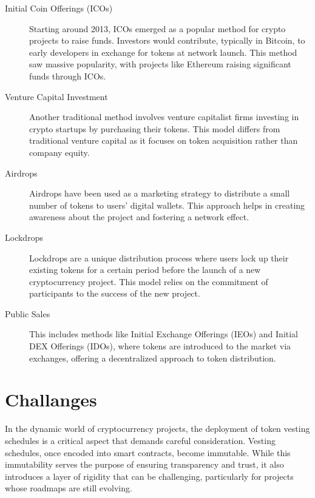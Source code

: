 \documentclass[12pt,oneside]{article}
\begin{document}
\begin{description}
  \item[Initial Coin Offerings (ICOs)]
  Starting around 2013, ICOs emerged as a popular method for crypto projects to raise funds.
  Investors would contribute, typically in Bitcoin, to early developers in exchange for 
  tokens at network launch. This method saw massive popularity, with projects 
  like Ethereum raising significant funds through ICOs.

  \item[Venture Capital Investment]
  Another traditional method involves venture capitalist firms investing 
  in crypto startups by purchasing their tokens. This model differs from 
  traditional venture capital as it focuses on token acquisition rather than company equity.

  \item[Airdrops]
  Airdrops have been used as a marketing strategy to distribute a small number of tokens 
  to users' digital wallets. This approach helps in creating awareness about the project 
  and fostering a network effect.

  \item[Lockdrops]
  Lockdrops are a unique distribution process where users lock up their existing 
  tokens for a certain period before the launch of a new cryptocurrency project. 
  This model relies on the commitment of participants to the success of the new project.

  \item[Public Sales]
  This includes methods like Initial Exchange Offerings (IEOs) and Initial DEX Offerings (IDOs), 
  where tokens are introduced to the market via exchanges, offering a decentralized approach 
  to token distribution.
\end{description}


\section{Challanges}

In the dynamic world of cryptocurrency projects, the deployment of token vesting schedules 
is a critical aspect that demands careful consideration. Vesting schedules, once encoded 
into smart contracts, become immutable. While this immutability serves the purpose 
of ensuring transparency and trust, it also introduces a layer of rigidity that can 
be challenging, particularly for projects whose roadmaps are still evolving.
\end{document}
